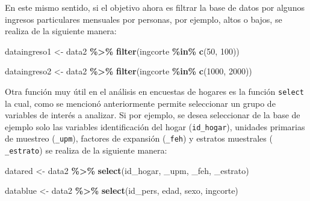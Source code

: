 \documentclass[
  12pt,
]{book}
\newenvironment{Shaded}{\begin{snugshade}}{\end{snugshade}}
\newcommand{\AttributeTok}[1]{\textcolor[rgb]{0.13,0.29,0.53}{#1}}
\newcommand{\DecValTok}[1]{\textcolor[rgb]{0.00,0.00,0.81}{#1}}
\newcommand{\FunctionTok}[1]{\textcolor[rgb]{0.13,0.29,0.53}{\textbf{#1}}}
\newcommand{\NormalTok}[1]{#1}
\newcommand{\OtherTok}[1]{\textcolor[rgb]{0.56,0.35,0.01}{#1}}
\newcommand{\SpecialCharTok}[1]{\textcolor[rgb]{0.81,0.36,0.00}{\textbf{#1}}}
\newcommand{\StringTok}[1]{\textcolor[rgb]{0.31,0.60,0.02}{#1}}
\begin{document}
En este mismo sentido, si el objetivo ahora es filtrar la base de datos por algunos ingresos particulares mensuales por personas, por ejemplo, altos o bajos, se realiza de la siguiente manera:

\begin{Shaded}
\begin{Highlighting}[]
\NormalTok{dataingreso1 }\OtherTok{\textless{}{-}}\NormalTok{ data2 }\SpecialCharTok{\%\textgreater{}\%} 
  \FunctionTok{filter}\NormalTok{(ingcorte }\SpecialCharTok{\%in\%} \FunctionTok{c}\NormalTok{(}\DecValTok{50}\NormalTok{, }\DecValTok{100}\NormalTok{))}

\NormalTok{dataingreso2 }\OtherTok{\textless{}{-}}\NormalTok{ data2 }\SpecialCharTok{\%\textgreater{}\%} 
  \FunctionTok{filter}\NormalTok{(ingcorte }\SpecialCharTok{\%in\%} \FunctionTok{c}\NormalTok{(}\DecValTok{1000}\NormalTok{, }\DecValTok{2000}\NormalTok{))}
\end{Highlighting}
\end{Shaded}

Otra función muy útil en el análisis en encuestas de hogares es la función \texttt{select} la cual, como se mencionó anteriormente permite seleccionar un grupo de variables de interés a analizar. Si por ejemplo, se desea seleccionar de la base de ejemplo solo las variables identificación del hogar (\texttt{id\_hogar}), unidades primarias de muestreo (\texttt{\_upm}), factores de expansión (\texttt{\_feh}) y estratos muestrales ( \texttt{\_estrato}) se realiza de la siguiente manera:

\begin{Shaded}
\begin{Highlighting}[]
\NormalTok{datared }\OtherTok{\textless{}{-}}\NormalTok{ data2 }\SpecialCharTok{\%\textgreater{}\%} \FunctionTok{select}\NormalTok{(}\StringTok{\textasciigrave{}}\AttributeTok{id\_hogar}\StringTok{\textasciigrave{}}\NormalTok{, }\StringTok{\textasciigrave{}}\AttributeTok{\_upm}\StringTok{\textasciigrave{}}\NormalTok{,}
                            \StringTok{\textasciigrave{}}\AttributeTok{\_feh}\StringTok{\textasciigrave{}}\NormalTok{, }\StringTok{\textasciigrave{}}\AttributeTok{\_estrato}\StringTok{\textasciigrave{}}\NormalTok{)}

\NormalTok{datablue }\OtherTok{\textless{}{-}}\NormalTok{ data2 }\SpecialCharTok{\%\textgreater{}\%} \FunctionTok{select}\NormalTok{(id\_pers, edad, }
\NormalTok{                             sexo, ingcorte)}
\end{Highlighting}
\end{Shaded}
\end{document}
